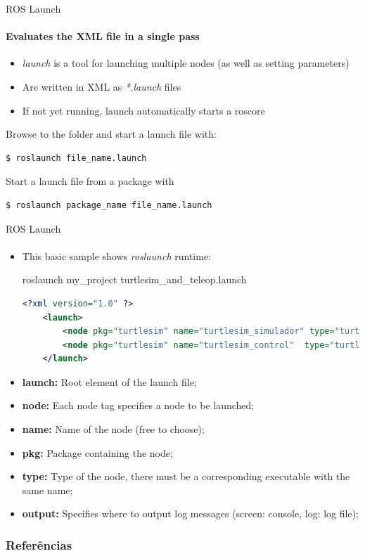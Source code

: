 \documentclass[aspectratio=169]{beamer}
\begin{document}
\begin{frame}[fragile]{ROS Launch}
	\framesubtitle{Evaluates the XML file in a single pass}
	\begin{itemize}
		\item \textit{launch} is a tool for launching multiple nodes (as well as setting parameters)
		\item Are written in XML as \textit{*.launch} files
		\item If not yet running, launch automatically starts a roscore
	\end{itemize}

	Browse to the folder and start a launch file with:
	
	\begin{lstlisting}[language=bash]
		$ roslaunch file_name.launch
	\end{lstlisting}

	Start a launch file from a package with

	\begin{lstlisting}[language=bash]
		$ roslaunch package_name file_name.launch
	\end{lstlisting}
\end{frame}



\begin{frame}[fragile]{ROS Launch}
	\framesubtitle{}

	\begin{itemize}
		\item This basic sample shows \textit{roslaunch} runtime:
	
	\begin{block}{roslaunch my\_project turtlesim\_and\_teleop.launch}
		\begin{lstlisting}[language=XML]
	<?xml version="1.0" ?>
	<launch>
		<node pkg="turtlesim" name="turtlesim_simulador" type="turtlesim_node"></node>
		<node pkg="turtlesim" name="turtlesim_control"  type="turtle_teleop_key"></node>
	</launch>
		\end{lstlisting}
	\end{block}

		\item \textbf{launch:} Root element of the launch file;
		\item \textbf{node:} Each node tag specifies a node to be launched;
		\item \textbf{name:} Name of the node (free to choose);
		\item \textbf{pkg:} Package containing the node;
		\item \textbf{type:} Type of the node, there must be a corresponding executable with the same name;
		\item \textbf{output:} Specifies where to output log messages (screen: console, log: log file);
	
	\end{itemize}

\end{frame}

\begin{frame}[t, allowframebreaks]
	\frametitle{Referências}
	
\end{frame}
\end{document}
